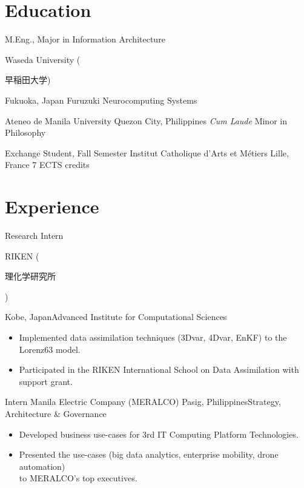 \documentclass[11pt,a4paper,sans]{moderncv}
\begin{document}
\maketitle


\section{Education}
        {M.Eng., Major in Information Architecture}
        {Waseda University (\begin{CJK}{UTF8}{min}早稲田大学)\end{CJK} }
        {Fukuoka, Japan}{}
        {Furuzuki Neurocomputing Systems}

        {Ateneo de Manila University}
        {Quezon City, Philippines}
        {\textit{Cum Laude}}
        {Minor in Philosophy}

        {Exchange Student, Fall Semester}
        {Institut Catholique d'Arts et M\'etiers}
        {Lille, France}{}
        {7 ECTS credits}

\section{Experience}

        {Research Intern}
        {RIKEN (\begin{CJK}{UTF8}{min}理化学研究所\end{CJK})}
        {Kobe, Japan}{Advanced Institute for Computational Sciences}
        {
            \begin{itemize}
                \item Implemented data assimilation techniques (3Dvar, 4Dvar, EnKF) to the Lorenz63 model.
                \item Participated in the RIKEN International School on Data Assimilation with support grant.
            \end{itemize}
        }

        {Intern}
        {Manila Electric Company (MERALCO)}
        {Pasig, Philippines}{Strategy, Architecture \& Governance}
        {
            \begin{itemize}
                \item Developed business use-cases for 3rd IT Computing Platform Technologies.
                \item Presented the use-cases (big data analytics, enterprise mobility, drone automation)\\ to MERALCO's top executives.
            \end{itemize}
        }
\end{document}

